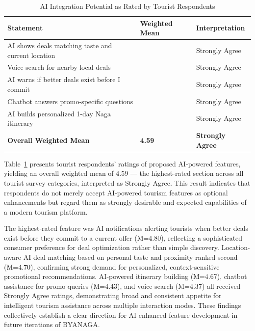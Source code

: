 \documentclass{research}
\begin{document}
\begin{table}[h]
\centering
\caption{AI Integration Potential as Rated by Tourist Respondents}
\label{tab:tourist_ai}
\begin{tabularx}{\textwidth}{>{\raggedright\arraybackslash}X>{\centering\arraybackslash}p{2.5cm}>{\centering\arraybackslash}p{3cm}}
\toprule
\textbf{Statement} & \textbf{Weighted Mean} & \textbf{Interpretation} \\
\midrule
AI shows deals matching taste and current location & 4.70 & Strongly Agree \\
Voice search for nearby local deals & 4.37 & Strongly Agree \\
AI warns if better deals exist before I commit & 4.80 & Strongly Agree \\
Chatbot answers promo-specific questions & 4.43 & Strongly Agree \\
AI builds personalized 1-day Naga itinerary & 4.67 & Strongly Agree \\
\midrule
\textbf{Overall Weighted Mean} & \textbf{4.59} & \textbf{Strongly Agree} \\
\bottomrule
\end{tabularx}
\end{table}

Table~\ref{tab:tourist_ai} presents tourist respondents' ratings of proposed 
AI-powered features, yielding an overall weighted mean of 4.59 --- the 
highest-rated section across all tourist survey categories, interpreted as 
Strongly Agree. This result indicates that respondents do not merely accept 
AI-powered tourism features as optional enhancements but regard them as strongly 
desirable and expected capabilities of a modern tourism platform.

The highest-rated feature was AI notifications alerting tourists when better 
deals exist before they commit to a current offer (M=4.80), reflecting a 
sophisticated consumer preference for deal optimization rather than simple 
discovery. Location-aware AI deal matching based on personal taste and proximity 
ranked second (M=4.70), confirming strong demand for personalized, context-sensitive 
promotional recommendations. AI-powered itinerary building (M=4.67), chatbot 
assistance for promo queries (M=4.43), and voice search (M=4.37) all received 
Strongly Agree ratings, demonstrating broad and consistent appetite for intelligent 
tourism assistance across multiple interaction modes. These findings collectively 
establish a clear direction for AI-enhanced feature development in future 
iterations of BYANAGA.
\end{document}
